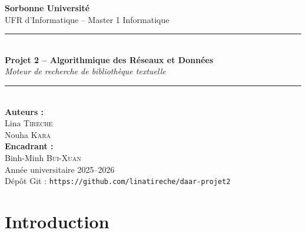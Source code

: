 \documentclass[12pt,a4paper]{article}
\begin{document}
\begin{titlepage}
  \centering
  \vspace*{2cm}
  {\Large \textbf{Sorbonne Université}\\[0.3em]
   \large UFR d'Informatique – Master 1 Informatique}\\[1cm]

  \rule{\linewidth}{0.8pt}\\[0.6em]
  {\LARGE \textbf{Projet 2 – Algorithmique des Réseaux et Données}}\\[0.4em]
  {\large \textit{Moteur de recherche de bibliothèque textuelle}}\\[0.3em]
  \rule{\linewidth}{0.8pt}\\[2cm]

  {\large \textbf{Auteurs :}\\[0.4em]
   Lina \textsc{Tireche}\\[0.2em]
   Nouha \textsc{Kara}}\\[2cm]

  {\large \textbf{Encadrant :}\\[0.4em]
   Binh-Minh \textsc{Bui-Xuan}}\\[2cm]

  {\large Année universitaire 2025–2026}\\[1cm]

  \vfill
  {\small Dépôt Git : \texttt{https://github.com/linatireche/daar-projet2}}
\end{titlepage}

\begin{abstract}
Ce rapport présente la réalisation complète d'un moteur de recherche textuelle
appliqué à un corpus de livres issus du Projet Gutenberg.
Nous avons construit une application web full-stack composée d'un backend
Python (FastAPI), d'un frontend React et d'une base de données PostgreSQL.
L'application permet de rechercher des livres par mots-clés, de recommander
des ouvrages similaires et de classer les livres selon leur importance dans
un graphe de proximité thématique. Le tout est containerisé avec Docker,
déployable sur Kubernetes, et soumis à une intégration continue via GitHub Actions.
\end{abstract}

\tableofcontents
\newpage

\section{Introduction}
\end{document}
